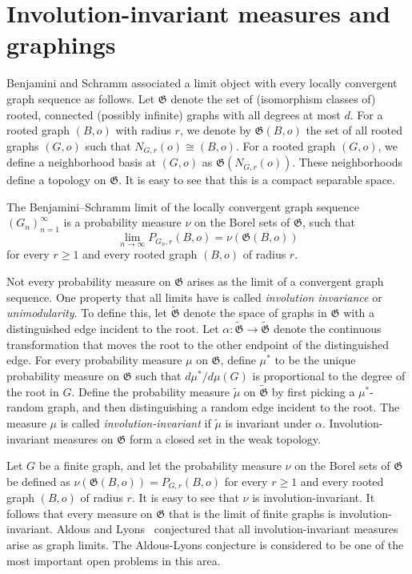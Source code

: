 \documentclass{article}
\def\Gf{\mathfrak{G}}\def\Hf{\mathfrak{H}}\def\If{\mathfrak{I}}
\begin{document}
\section{Involution-invariant measures and graphings}\label{graphing}

Benjamini and Schramm \cite{BS} associated a limit object with every
locally convergent graph sequence as follows. Let $\Gf$ denote the
set of (isomorphism classes of) rooted, connected (possibly infinite)
graphs with all degrees at most $d$. For a rooted graph $(B,o)$ with
radius $r$, we denote by $\Gf(B,o)$ the set of all rooted graphs
$(G,o)$ such that $N_{G,r}(o)\cong (B,o)$. For a rooted graph
$(G,o)$, we define a neighborhood basis at $(G,o)$ as
$\Gf(N_{G,r}(o))$. These neighborhoods define a topology on $\Gf$. It
is easy to see that this is a compact separable space.

The Benjamini--Schramm limit of the locally convergent graph sequence
$(G_n)_{n=1}^\infty$ is a probability measure $\nu$ on the Borel sets
of $\Gf$, such that
\[
\lim_{n \to \infty}
P_{G_n,r}(B,o) = \nu(\Gf(B,o))
\]
for every $r\ge1$ and every rooted graph $(B,o)$ of radius  $r$.

Not every probability measure on $\Gf$ arises as the limit of a
convergent graph sequence. One property that all limits have is
called \emph{involution invariance} or \emph{unimodularity}. To
define this, let $\tilde{\Gf}$ denote the space of graphs in $\Gf$
with a distinguished edge incident to the root. Let
$\alpha:\tilde{\Gf}\rightarrow\tilde{\Gf}$ denote the continuous
transformation that moves the root to the other endpoint of the
distinguished edge. For every probability measure $\mu$ on $\Gf$,
define $\mu^*$ to be the unique probability measure on $\Gf$ such
that $d\mu^*/d\mu(G)$ is proportional to the degree of the root in
$G$. Define the probability measure $\tilde{\mu}$ on $\tilde{\Gf}$ by
first picking a $\mu^*$-random graph, and then distinguishing a
random edge incident to the root. The measure $\mu$ is called
\emph{involution-invariant} if $\tilde{\mu}$ is invariant under
$\alpha$. Involution-invariant measures on $\Gf$ form a closed set in
the weak topology.


Let $G$ be a finite graph, and let the probability measure $\nu$ on
the Borel sets of $\Gf$ be defined as $\nu(\Gf(B,o))=P_{G,r}(B,o)$
for every $r\ge1$ and every rooted graph $(B,o)$ of radius $r$. It is
easy to see that $\nu$ is involution-invariant. It follows that every
measure on $\Gf$ that is the limit of finite graphs is
involution-invariant. Aldous and Lyons~\cite{AldousLyons} conjectured
that all involution-invariant measures arise as graph limits. The
Aldous-Lyons conjecture is considered to be one of the most important
open problems in this area.
\end{document}
